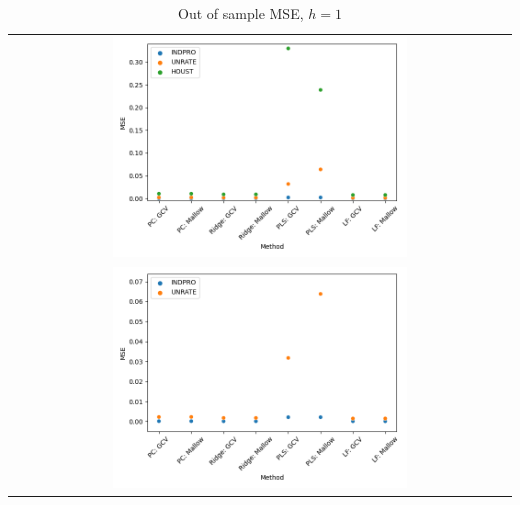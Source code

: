 \begin{table}[h!]
    \centering
    \begin{tabular}{c}
        \includegraphics[width=0.6\textwidth]{figures/MSE_oos_h1.png} \\
        \includegraphics[width=0.6\textwidth]{figures/MSE_oos_h1_noHOUST.png}
    \end{tabular}
    \caption*{Out of sample MSE, $h = 1$}
\end{table}

\clearpage

